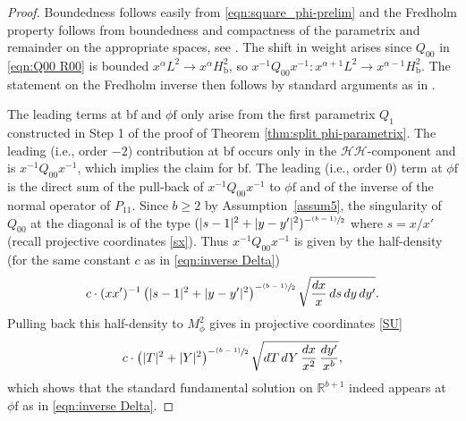 \documentclass[11pt]{article}
\newcommand{\ie}{i.e.,\xspace}
\numberwithin{equation}{section}
\newcommand{\psfrac}[2]{\sfrac{(#1)}{#2}}
\theoremstyle{plain}
\theoremstyle{definition}
\newcommand{\R}{{\mathbb{R}}}
\newcommand{\phif}{{\phi\mathrm{f}}}
\newcommand{\bb}{{\mathrm{b}}}
\newcommand{\bbf}{{\mathrm{bf}}}
\begin{document}
\begin{proof}
Boundedness follows easily from \eqref{eqn:square_phi-prelim} and the Fredholm property follows from boundedness and compactness of the parametrix and remainder on the appropriate spaces, see \cite[Th.\,13]{grieser-para}. The shift in weight arises since $Q_{00}$ in \eqref{eqn:Q00 R00} is bounded $x^\alpha L^2\to x^\alpha H^2_\bb$, so $x^{-1}Q_{00}x^{-1}: x^{\alpha+1}L^2\to x^{\alpha-1}H^2_\bb$. The statement on the Fredholm inverse then follows by standard arguments as in
\cite[Prop.\,5.42 \& 5.64]{melrose1993atiyah}.

The leading terms at $\bbf$ and $\phif$ only arise from the first parametrix $Q_1$ constructed in Step 1 of the proof of Theorem \ref{thm:split phi-parametrix}. The leading (\ie order $-2$) contribution at $\bbf$ occurs only in the $\mathscr{H}\mathscr{H}$-component and is $x^{-1}Q_{00}x^{-1}$, which implies the claim for $\bbf$.
The leading (\ie order $0$) term at $\phif$ is the direct sum of the pull-back of $x^{-1}Q_{00}x^{-1}$ to $\phif$ and of the inverse of the normal operator of $P_{11}$. Since $b\geq2$ by Assumption~\ref{assum5}, the singularity of $Q_{00}$ at the diagonal is of the type $(|s-1|^2+|y-y'|^2)^{-\psfrac{b-1}2}$ where $s=x/x'$ (recall projective
coordinates \eqref{sx}). Thus $x^{-1}Q_{00}x^{-1}$ is given
by the half-density (for the same constant $c$ as in \eqref{eqn:inverse Delta})\vspace*{-3pt}
\[
c \cdot (xx')^{-1}\left(|s-1|^2+|y-y'|^2\right)^{-\psfrac{b-1}2} \sqrt{\frac{dx}x\, ds\, dy\,dy'}.
\]
Pulling back this half-density to $M^2_\phi$ gives in projective coordinates \eqref{SU}\vspace*{-3pt}
\[
c \cdot \left(|T|^2+|Y|^2\right)^{-\psfrac{b-1}2} \sqrt{dT\,dY\,\frac{dx}{x^2}\,\frac{dy'}{x^b}},
\]
which shows that the standard fundamental solution on $\R^{b+1}$
indeed appears at $\phif$ as in \eqref{eqn:inverse Delta}.
\end{proof}
\end{document}
